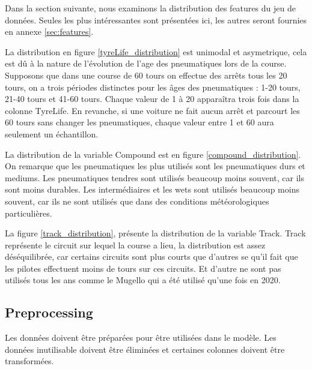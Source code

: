 Dans la section suivante, nous examinons la distribution des features du jeu de données.
Seules les plus intéressantes sont présentées ici, les autres seront fournies en annexe \ref{sec:features}.

La distribution en figure \ref{tyreLife_distribution} est unimodal et asymetrique, cela est dû à la nature de l'évolution de l'age des pneumatiques lors de la course.
Supposons que dans une course de 60 tours on effectue des arrêts tous les 20 tours, on a trois périodes distinctes pour les âges des pneumatiques : 1-20 tours, 21-40 tours et 41-60 tours.
Chaque valeur de 1 à 20 apparaîtra trois fois dans la colonne TyreLife.
En revanche, si une voiture ne fait aucun arrêt et parcourt les 60 tours sans changer les pneumatiques, chaque valeur entre 1 et 60 aura seulement un échantillon.


La distribution de la variable Compound est en figure \ref{compound_distribution}.
On remarque que les pneumatiques les plus utilisés sont les pneumatiques durs et mediums. Les pneumatiques tendres sont utilisés beaucoup moins souvent, car ils sont moins durables.
Les intermédiaires et les wets sont utilisés beaucoup moins souvent, car ils ne sont utilisés que dans des conditions météorologiques particulières.


La figure \ref{track_distribution}, présente la distribution de la variable Track.
Track représente le circuit sur lequel la course a lieu, la distribution est assez déséquilibrée, car certains circuits sont plus courts que d'autres se qu'il fait que les pilotes effectuent moins de tours sur ces circuits.
Et d'autre ne sont pas utilisés tous les ans comme le Mugello qui a été utilisé qu'une fois en 2020.



\subsection{Preprocessing}
Les données doivent être préparées pour être utilisées dans le modèle. Les données inutilisable doivent être éliminées
et certaines colonnes doivent être transformées.

